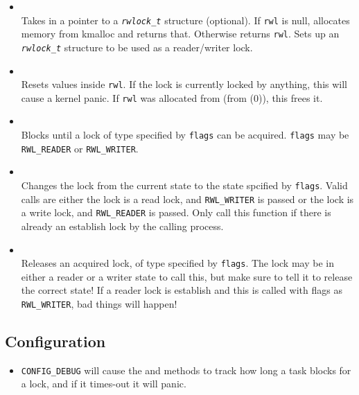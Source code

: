 \begin{itemize}
\item {} \\
Takes in a pointer to a \texttt{\textit{rwlock\_t}} structure (optional). If \texttt{rwl} is null, allocates
memory from kmalloc and returns that. Otherwise returns \texttt{rwl}. Sets up an \texttt{\textit{rwlock\_t}}
structure to be used as a reader/writer lock.

\item {} \\
Resets values inside \texttt{rwl}. If the lock is currently locked by anything,
this will cause a kernel panic. If \texttt{rwl} was allocated from  (from (0)), this frees it.

\item {} \\
Blocks until a lock of type specified by \texttt{flags} can be acquired. \texttt{flags} may
be \texttt{RWL\_READER} or \texttt{RWL\_WRITER}. 
\item {} \\
Changes the lock from the current state to the state spcified by \texttt{flags}. Valid calls are either
the lock is a read lock, and \texttt{RWL\_WRITER} is passed or the lock is a write lock, and \texttt{RWL\_READER}
is passed. Only call this function if there is already an establish lock by the calling process.
\item {} \\
Releases an acquired lock, of type specified by \texttt{flags}. The lock may be in either a reader or a writer state to call this, but
make sure to tell it to release the correct state! If a reader lock is establish and this is called
with flags as \texttt{RWL\_WRITER}, bad things will happen!
\end{itemize}

\subsection{Configuration}
\begin{itemize}
\item \texttt{CONFIG\_DEBUG} will cause the  and 
methods to track how long a task blocks for a lock, and if it times-out it will panic.
\end{itemize}

